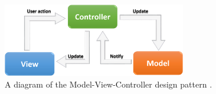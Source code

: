 \begin{figure}[H]

	\centering
	\includegraphics[width=8cm]{./graphics/mvc.png}
	\caption{A diagram of the Model-View-Controller design pattern	\cite{mvc_tutorialspoint}.}
	\label{fig:mvc}
	
\end{figure}